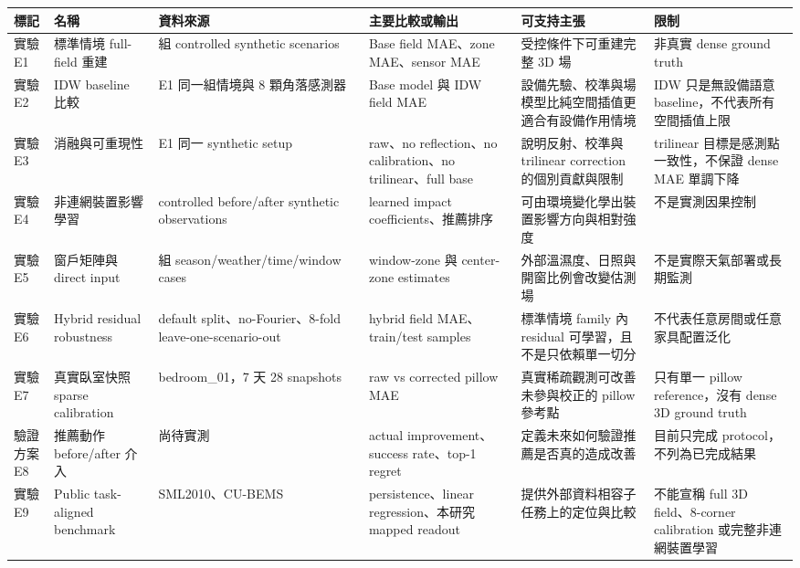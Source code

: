 \documentclass[12pt,a4paper]{article}
\begin{document}
\begin{table}[htbp]
\centering
\footnotesize
\renewcommand{\arraystretch}{1.25}
\begin{tabular}{|>{\raggedright\arraybackslash}p{}|>{\raggedright\arraybackslash}p{}|>{\raggedright\arraybackslash}p{}|>{\raggedright\arraybackslash}p{}|>{\raggedright\arraybackslash}p{}|>{\raggedright\arraybackslash}p{}|}
\hline
\textbf{標記} & \textbf{名稱} & \textbf{資料來源} & \textbf{主要比較或輸出} & \textbf{可支持主張} & \textbf{限制} \\
\hline
實驗 E1 & 標準情境 full-field 重建 & 8 組 controlled synthetic scenarios & Base field MAE、zone MAE、sensor MAE & 受控條件下可重建完整 3D 場 & 非真實 dense ground truth \\
\hline
實驗 E2 & IDW baseline 比較 & E1 同一組情境與 8 顆角落感測器 & Base model 與 IDW field MAE & 設備先驗、校準與場模型比純空間插值更適合有設備作用情境 & IDW 只是無設備語意 baseline，不代表所有空間插值上限 \\
\hline
實驗 E3 & 消融與可重現性 & E1 同一 synthetic setup & raw、no reflection、no calibration、no trilinear、full base & 說明反射、校準與 trilinear correction 的個別貢獻與限制 & trilinear 目標是感測點一致性，不保證 dense MAE 單調下降 \\
\hline
實驗 E4 & 非連網裝置影響學習 & controlled before/after synthetic observations & learned impact coefficients、推薦排序 & 可由環境變化學出裝置影響方向與相對強度 & 不是實測因果控制 \\
\hline
實驗 E5 & 窗戶矩陣與 direct input & 48 組 season/weather/time/window cases & window-zone 與 center-zone estimates & 外部溫濕度、日照與開窗比例會改變估測場 & 不是實際天氣部署或長期監測 \\
\hline
實驗 E6 & Hybrid residual robustness & default split、no-Fourier、8-fold leave-one-scenario-out & hybrid field MAE、train/test samples & 標準情境 family 內 residual 可學習，且不是只依賴單一切分 & 不代表任意房間或任意家具配置泛化 \\
\hline
實驗 E7 & 真實臥室快照 sparse calibration & bedroom\_\allowbreak{}01，7 天 28 snapshots & raw vs corrected pillow MAE & 真實稀疏觀測可改善未參與校正的 pillow 參考點 & 只有單一 pillow reference，沒有 dense 3D ground truth \\
\hline
驗證方案 E8 & 推薦動作 before/after 介入 & 尚待實測 & actual improvement、success rate、top-1 regret & 定義未來如何驗證推薦是否真的造成改善 & 目前只完成 protocol，不列為已完成結果 \\
\hline
實驗 E9 & Public task-aligned benchmark & SML2010、CU-BEMS & persistence、linear regression、本研究 mapped readout & 提供外部資料相容子任務上的定位與比較 & 不能宣稱 full 3D field、8-corner calibration 或完整非連網裝置學習 \\
\hline
\end{tabular}
\end{table}
\end{document}
